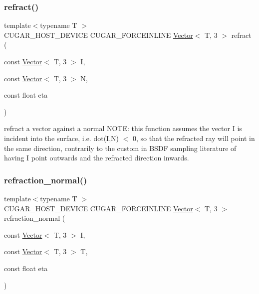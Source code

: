 \subsubsection{\texorpdfstring{refract()}{refract()}}
{\footnotesize\ttfamily template$<$typename T $>$ \\
C\+U\+G\+A\+R\+\_\+\+H\+O\+S\+T\+\_\+\+D\+E\+V\+I\+CE C\+U\+G\+A\+R\+\_\+\+F\+O\+R\+C\+E\+I\+N\+L\+I\+NE \hyperlink{structcugar_1_1_vector}{Vector}$<$ T, 3 $>$ refract (\begin{DoxyParamCaption}\item[{const \hyperlink{structcugar_1_1_vector}{Vector}$<$ T, 3 $>$}]{I,  }\item[{const \hyperlink{structcugar_1_1_vector}{Vector}$<$ T, 3 $>$}]{N,  }\item[{const float}]{eta }\end{DoxyParamCaption})\hspace{0.3cm}{\ttfamily [related]}}

refract a vector against a normal N\+O\+TE\+: this function assumes the vector I is incident into the surface, i.\+e. dot(\+I,\+N) $<$ 0, so that the refracted ray will point in the same direction, contrarily to the custom in B\+S\+DF sampling literature of having I point outwards and the refracted direction inwards. \mbox{\label{group___vectors_module_ga327ba98b7cb9214bd6cf2199543fc0ee}} 
\subsubsection{\texorpdfstring{refraction\+\_\+normal()}{refraction\_normal()}}
{\footnotesize\ttfamily template$<$typename T $>$ \\
C\+U\+G\+A\+R\+\_\+\+H\+O\+S\+T\+\_\+\+D\+E\+V\+I\+CE C\+U\+G\+A\+R\+\_\+\+F\+O\+R\+C\+E\+I\+N\+L\+I\+NE \hyperlink{structcugar_1_1_vector}{Vector}$<$ T, 3 $>$ refraction\+\_\+normal (\begin{DoxyParamCaption}\item[{const \hyperlink{structcugar_1_1_vector}{Vector}$<$ T, 3 $>$}]{I,  }\item[{const \hyperlink{structcugar_1_1_vector}{Vector}$<$ T, 3 $>$}]{T,  }\item[{const float}]{eta }\end{DoxyParamCaption})\hspace{0.3cm}{\ttfamily [related]}}

